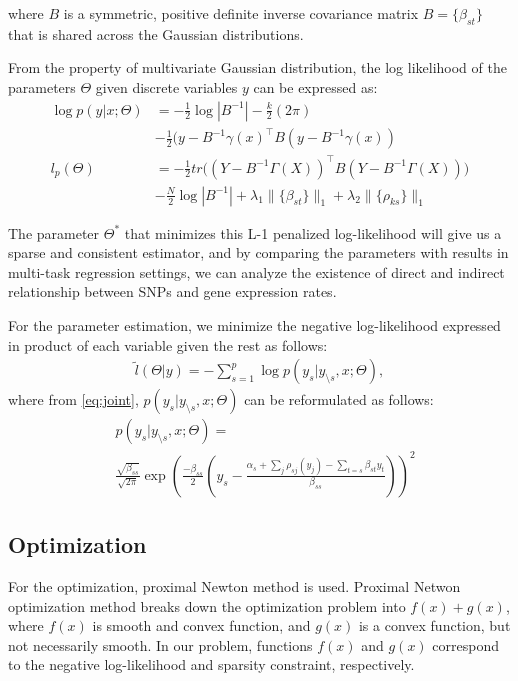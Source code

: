 \documentclass{article}
\begin{document}
where $B$ is a symmetric, positive definite inverse covariance matrix $B = \{ \beta_{st}\}$ that is shared across the Gaussian distributions. 

From the property of multivariate Gaussian distribution, the log likelihood of the parameters $\Theta$ given discrete variables $y$ can be expressed as:
\begin{align}
\log p(y | x; \Theta) &= -\frac{1}{2}\log |B^{-1}| -\frac{k}{2} (2 \pi) \nonumber    \\
& -\frac{1}{2} (y - B^{-1} \gamma(x)^\intercal B (y - B^{-1} \gamma(x)) \label{eq:loglikli} \\ 
l_p(\Theta) &= -\frac{1}{2} tr\Big((Y - B^{-1} \Gamma(X))^\intercal B (Y - B^{-1} \Gamma(X)) \Big) \nonumber \\
& -\frac{N}{2} \log|B^{-1}| + \lambda_1 \|\{\beta_{st}\}\|_1 + \lambda_2 \|\{\rho_{ks}\}\|_1 \label{eq:obj}
\end{align}

The parameter $\Theta^*$ that minimizes this L-1 penalized log-likelihood will give us a sparse and consistent estimator, and by comparing the parameters with results in multi-task regression settings, we can analyze the existence of direct and indirect relationship between SNPs and gene expression rates.

For the parameter estimation, we minimize the negative log-likelihood expressed in product of each variable given the rest as follows:
\begin{align}
\tilde{l}(\Theta |y) = - \sum_{s=1}^{p} \log p(y_s |y_{\setminus s}, x;\Theta),
\end{align}
where from \ref{eq:joint}, $p(y_s |y_{\setminus s}, x;\Theta)$ can be reformulated as follows:
\begin{align}
&p(y_s |y_{\setminus s}, x;\Theta) =\nonumber    \\
& \frac{\sqrt{\beta_{ss}}}{\sqrt{2\pi}} \exp \left(\frac{-\beta_{ss}}{2} \left(y_s - \frac{\alpha_s + \sum_j \rho_{sj}(y_j)-\sum_{t=s}\beta_{st}y_t }{\beta_{ss}}\right) \right)^2
\end{align}




\subsection{Optimization}
For the optimization, proximal Newton method \cite{schmidt2010graphical,schmidt2011projected} is used. Proximal Netwon optimization method breaks down the optimization problem into $f(x) + g(x)$, where $f(x)$ is smooth and convex function, and $g(x)$ is a convex function, but not necessarily smooth. 
In our problem, functions $f(x)$ and $g(x)$ correspond to the negative log-likelihood and sparsity constraint, respectively.
\end{document}
